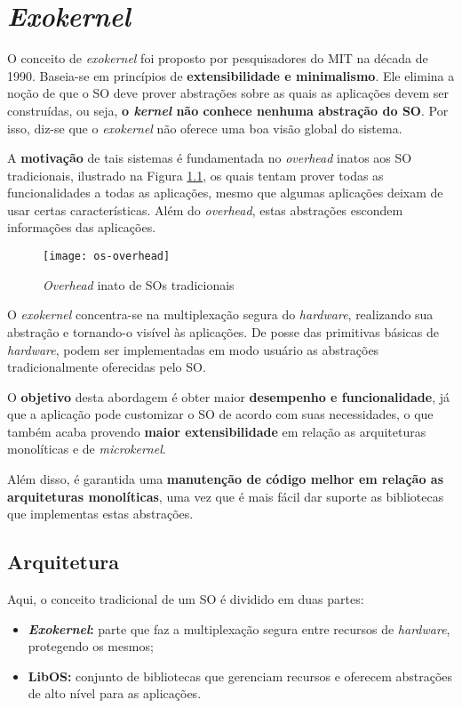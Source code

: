 \chapter{\textit{Exokernel}}
O conceito de \textit{exokernel} foi proposto por pesquisadores do MIT na década de 1990. Baseia-se em princípios de \textbf{extensibilidade e minimalismo}. Ele elimina a noção de que o SO deve prover abstrações sobre as quais as aplicações devem ser construídas, ou seja, \textbf{o \textit{kernel} não conhece nenhuma abstração do SO}. Por isso, diz-se que o \textit{exokernel} não oferece uma boa visão global do sistema.

A \textbf{motivação} de tais sistemas é fundamentada no \textit{overhead} inatos aos SO tradicionais, ilustrado na Figura \ref{fig:os-overhead}, os quais tentam prover todas as funcionalidades a todas as aplicações, mesmo que algumas aplicações deixam de usar certas características. Além do \textit{overhead}, estas abstrações escondem informações das aplicações.

\begin{figure}[H]
  \centering
  \texttt{[image: os-overhead]}
  \caption{\textit{Overhead} inato de SOs tradicionais}
  \label{fig:os-overhead}
\end{figure}

O \textit{exokernel} concentra-se na multiplexação segura do \textit{hardware}, realizando sua abstração e tornando-o visível às aplicações. De posse das primitivas básicas de \textit{hardware}, podem ser implementadas em modo usuário as abstrações tradicionalmente oferecidas pelo SO.

O \textbf{objetivo} desta abordagem é obter maior \textbf{desempenho e funcionalidade}, já que a aplicação pode customizar o SO de acordo com suas necessidades, o que também acaba provendo \textbf{maior extensibilidade} em relação as arquiteturas monolíticas e de \textit{microkernel}.

Além disso, é garantida uma \textbf{manutenção de código melhor em relação as arquiteturas monolíticas}, uma vez que é mais fácil dar suporte as bibliotecas que implementas estas abstrações.

\section{Arquitetura}
Aqui, o conceito tradicional de um SO é dividido em duas partes:
\begin{itemize}
  \item \textbf{\textit{Exokernel}:} parte que faz a multiplexação segura entre recursos de \textit{hardware}, protegendo os mesmos;

  \item \textbf{LibOS:} conjunto de bibliotecas que gerenciam recursos e oferecem abstrações de alto nível para as aplicações.
\end{itemize}

